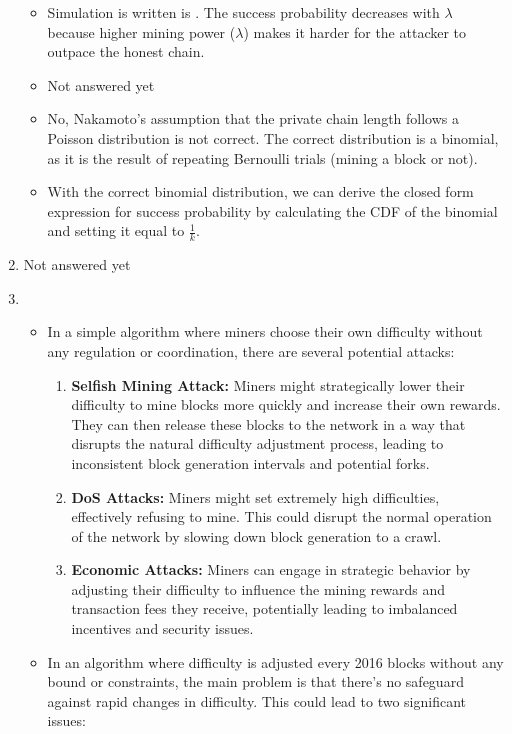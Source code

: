 \documentclass{report}
\begin{document}
\begin{enumerate}
	\begin{itemize}
		\item Simulation is written is . The success probability decreases with $\lambda$ because higher mining power ($\lambda$) makes it harder for the attacker to outpace the honest chain.
		\item Not answered yet \text{:))}
		\item No, Nakamoto's assumption that the private chain length follows a Poisson distribution is not correct. The correct distribution is a binomial, as it is the result of repeating Bernoulli trials (mining a block or not).
		\item With the correct binomial distribution, we can derive the closed form expression for success probability by calculating the CDF of the binomial and setting it equal to $\frac{1}{k}$.
	\end{itemize}
	\item Not answered yet \text{:))}	
	\item \begin{itemize}
		\item  In a simple algorithm where miners choose their own difficulty without any regulation or coordination, there are several potential attacks:
		\begin{enumerate}
			\item \textbf{Selfish Mining Attack:} Miners might strategically lower their difficulty to mine blocks more quickly and increase their own rewards. They can then release these blocks to the network in a way that disrupts the natural difficulty adjustment process, leading to inconsistent block generation intervals and potential forks.
			\item \textbf{DoS Attacks:} Miners might set extremely high difficulties, effectively refusing to mine. This could disrupt the normal operation of the network by slowing down block generation to a crawl.
			\item \textbf{Economic Attacks:} Miners can engage in strategic behavior by adjusting their difficulty to influence the mining rewards and transaction fees they receive, potentially leading to imbalanced incentives and security issues.
		\end{enumerate}
		\item  In an algorithm where difficulty is adjusted every 2016 blocks without any bound or constraints, the main problem is that there's no safeguard against rapid changes in difficulty. This could lead to two significant issues:
		\begin{enumerate}

\end{enumerate}
\end{itemize}
\end{enumerate}
\end{document}
